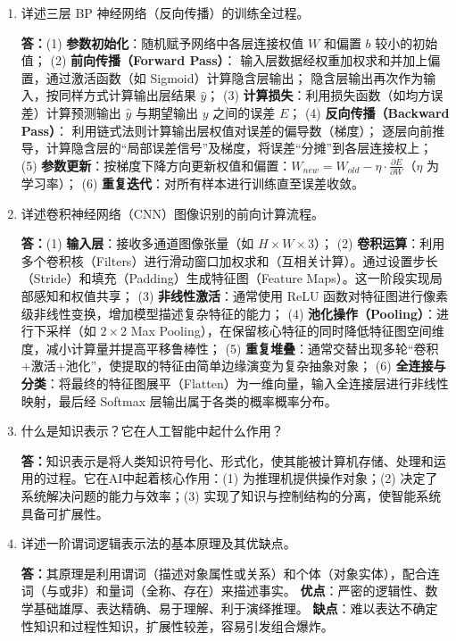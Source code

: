 \documentclass[12pt,a4paper,openany]{ctexbook}
\begin{document}
\begin{enumerate}[leftmargin=2em,itemsep=1em]
\item 详述三层 BP 神经网络（反向传播）的训练全过程。

\textbf{答：}(1) \textbf{参数初始化}：随机赋予网络中各层连接权值 $W$ 和偏置 $b$ 较小的初始值；
(2) \textbf{前向传播（Forward Pass）}：
输入层数据经权重加权求和并加上偏置，通过激活函数（如 Sigmoid）计算隐含层输出；
隐含层输出再次作为输入，按同样方式计算输出层结果 $\hat{y}$；
(3) \textbf{计算损失}：利用损失函数（如均方误差）计算预测输出 $\hat{y}$ 与期望输出 $y$ 之间的误差 $E$；
(4) \textbf{反向传播（Backward Pass）}：
利用链式法则计算输出层权值对误差的偏导数（梯度）；
逐层向前推导，计算隐含层的“局部误差信号”及梯度，将误差“分摊”到各层连接权上；
(5) \textbf{参数更新}：按梯度下降方向更新权值和偏置：$W_{new} = W_{old} - \eta \cdot \frac{\partial E}{\partial W}$（$\eta$ 为学习率）；
(6) \textbf{重复迭代}：对所有样本进行训练直至误差收敛。

\item 详述卷积神经网络（CNN）图像识别的前向计算流程。

\textbf{答：}(1) \textbf{输入层}：接收多通道图像张量（如 $H \times W \times 3$）；
(2) \textbf{卷积运算}：利用多个卷积核（Filters）进行滑动窗口加权求和（互相关计算）。通过设置步长（Stride）和填充（Padding）生成特征图（Feature Maps）。这一阶段实现局部感知和权值共享；
(3) \textbf{非线性激活}：通常使用 ReLU 函数对特征图进行像素级非线性变换，增加模型描述复杂特征的能力；
(4) \textbf{池化操作（Pooling）}：进行下采样（如 $2\times 2$ Max Pooling），在保留核心特征的同时降低特征图空间维度，减小计算量并提高平移鲁棒性；
(5) \textbf{重复堆叠}：通常交替出现多轮“卷积+激活+池化”，使提取的特征由简单边缘演变为复杂抽象对象；
(6) \textbf{全连接与分类}：将最终的特征图展平（Flatten）为一维向量，输入全连接层进行非线性映射，最后经 Softmax 层输出属于各类的概率概率分布。

\item 什么是知识表示？它在人工智能中起什么作用？

\textbf{答：}知识表示是将人类知识符号化、形式化，使其能被计算机存储、处理和运用的过程。它在AI中起着核心作用：(1) 为推理机提供操作对象；(2) 决定了系统解决问题的能力与效率；(3) 实现了知识与控制结构的分离，使智能系统具备可扩展性。

\item 详述一阶谓词逻辑表示法的基本原理及其优缺点。

\textbf{答：}其原理是利用谓词（描述对象属性或关系）和个体（对象实体），配合连词（与或非）和量词（全称、存在）来描述事实。
\textbf{优点}：严密的逻辑性、数学基础雄厚、表达精确、易于理解、利于演绎推理。
\textbf{缺点}：难以表达不确定性知识和过程性知识，扩展性较差，容易引发组合爆炸。


\end{enumerate}
\end{document}
